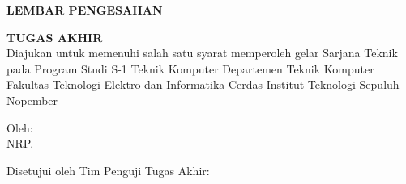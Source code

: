 \begin{center}
  \large
  \textbf{LEMBAR PENGESAHAN}
\end{center}

\thispagestyle{empty}

\begin{center}
  \textbf{\tatitle{}}
\end{center}

\begingroup
\small

\begin{center}
  \textbf{TUGAS AKHIR}
  \\Diajukan untuk memenuhi salah satu syarat memperoleh gelar Sarjana Teknik pada Program Studi S-1 Teknik Komputer Departemen Teknik Komputer Fakultas Teknologi Elektro dan Informatika Cerdas Institut Teknologi Sepuluh Nopember
\end{center}

\begin{center}
  Oleh: \name{}
  \\NRP. \nrp{}
\end{center}

\begin{center}
  Disetujui oleh Tim Penguji Tugas Akhir:
\end{center}

\begingroup
\setlength{\tabcolsep}{0pt}


